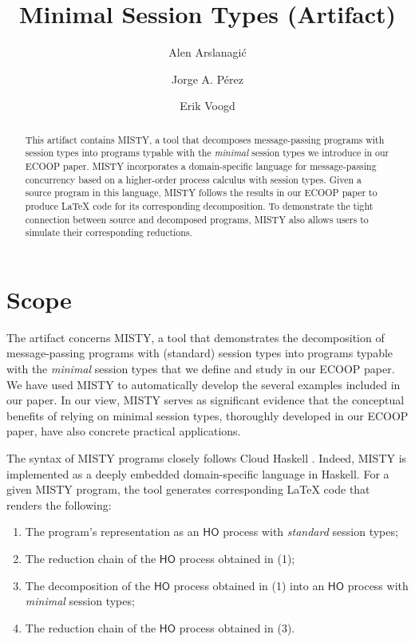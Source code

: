 \documentclass[a4paper,UKenglish]{darts-v2019}
\title{Minimal Session Types (Artifact)}
\author{Alen Arslanagi\'{c}}{University of Groningen, The Netherlands}{}{https://orcid.org/0000-0002-0292-478X}{}
\author{Jorge A. P\'{e}rez}{University of Groningen, The Netherlands}{}{https://orcid.org/0000-0002-1452-6180}{}
\author{Erik Voogd}{University of Groningen, The Netherlands}{}{}{}
\newenvironment{scope}{\section{Scope}}{}
\newcommand{\HO}{\ensuremath{\mathsf{HO}}\xspace}
\newcommand{\misty}{\textsf{MISTY}\xspace}
\begin{document}
\maketitle

\begin{abstract}
This artifact contains \misty, a tool that decomposes message-passing programs with session types into programs typable with the \emph{minimal} session types we introduce in our ECOOP paper.
\misty incorporates a domain-specific language for message-passing concurrency based on a higher-order process calculus with {session types}.
Given a source program in this language, \misty follows the results in our ECOOP paper  
to produce \LaTeX\xspace code for its corresponding decomposition.  
To demonstrate the tight connection between source and decomposed programs,
\misty also allows users to simulate their corresponding reductions.
\end{abstract}

\begin{scope}
The artifact concerns \misty, a tool that demonstrates the decomposition of message-passing programs with (standard) session types into programs typable with
the \emph{minimal} session types that we define and study in our ECOOP paper. 
We have used \misty to automatically develop the several examples included in our paper. 
In our view, \misty serves as significant evidence that the conceptual benefits of relying on minimal session types, thoroughly developed in our ECOOP paper, have also concrete practical applications. 

The syntax of \misty programs closely follows Cloud Haskell
\cite{Epstein:2011:THC:2096148.2034690}. Indeed, \misty is implemented as a deeply embedded domain-specific language in 
Haskell. 
For a given \misty program, the tool generates corresponding \LaTeX\xspace code that renders the following: 
\begin{enumerate}
		\item The program's representation as an \HO process with \emph{standard} session types;
		\item The reduction chain of the \HO process obtained in (1);
		\item The decomposition of the \HO process obtained in (1) into an \HO process with \emph{minimal} session types;
		\item The reduction chain of the \HO process obtained in (3).
\end{enumerate}
\end{scope}
\end{document}
